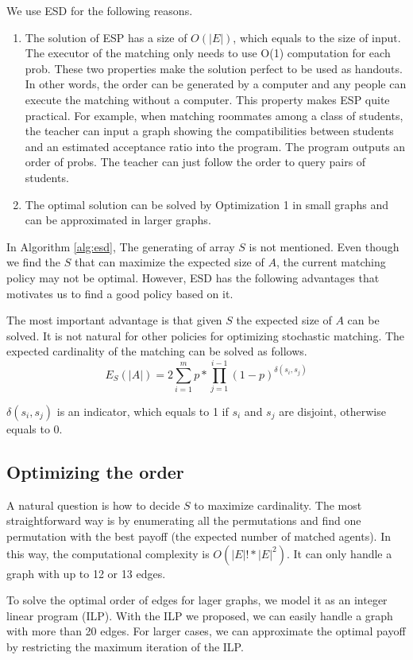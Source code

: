 \documentclass[letterpaper]{article}
\begin{document}
We use ESD for the following reasons.
\begin{enumerate}
	\item The solution of ESP has a size of $O(|E|)$, which equals to the size of input. The executor of the matching only needs to use O(1) computation for each prob. These two properties make the solution perfect to be used as handouts. In other words, the order can be generated by a computer and any people can execute the matching without a computer.
	This property makes ESP quite practical. For example, when matching roommates among a class of students, the teacher can input a graph showing the compatibilities between students and an estimated acceptance ratio into the program. The program outputs an order of probs. The teacher can just follow the order to query pairs of students. 
	\item The optimal solution can be solved by Optimization 1 in small graphs and can be approximated in larger graphs.
\end{enumerate}

In Algorithm \ref{alg:esd}, The generating of array $S$ is not mentioned.
Even though we find the $S$ that can maximize the expected size of $A$, the current matching policy may not be optimal.
However, ESD has the following advantages that motivates us to find a good policy based on it.

The most important advantage is that given $S$ the expected size of $A$ can be solved. It is not natural for other policies for optimizing stochastic matching. The expected cardinality of the matching can be solved as follows.
\begin{equation}
E_S(|A|)=2\sum_{i=1}^m p*\prod_{j=1}^{i-1}(1-p)^{\delta(s_i,s_j)}
\end{equation}

$\delta(s_i,s_j)$ is an indicator, which equals to 1 if $s_i$ and $s_j$ are disjoint, otherwise equals to 0.

\subsection{Optimizing the order}
A natural question is how to decide $S$ to maximize cardinality.
The most straightforward way is by enumerating all the permutations and find one permutation with the best payoff (the expected number of matched agents).
In this way, the computational complexity is $O(|E|!*|E|^2)$.
It can only handle a graph with up to 12 or 13 edges.

To solve the optimal order of edges for lager graphs, we model it as an integer linear program (ILP).
With the ILP we proposed, we can easily handle a graph with more than 20 edges.
For larger cases, we can approximate the optimal payoff by restricting the maximum iteration of the ILP.
\end{document}
